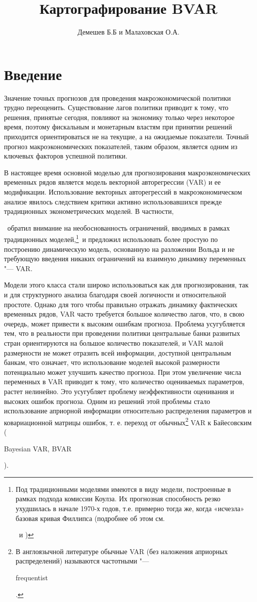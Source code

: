 \documentclass[11pt]{article} %
\title{Картографирование BVAR}
\author{Демешев Б.Б и Малаховская О.А.}
\newcommand{\eng}[1]{\begin{otherlanguage}{english}#1\end{otherlanguage}}
\begin{document}

\section{Введение}

Значение точных прогнозов для проведения макроэкономической политики трудно переоценить. Существование лагов политики приводит к тому, что решения, принятые сегодня, повлияют на экономику только через некоторое время, поэтому фискальным и монетарным властям при принятии решений приходится ориентироваться не на текущие, а на ожидаемые показатели. Точный прогноз макроэкономических показателей, таким образом, является одним из ключевых факторов успешной политики.

В настоящее время основной моделью для прогнозирования макроэкономических временных рядов является модель векторной  авторегрессии (VAR) и ее модификации. Использование векторных авторегрессий в макроэкономическом анализе явилось следствием критики активно использовавшихся прежде традиционных эконометрических моделей. В частности, \eng{\cite{sims_1980}}~обратил внимание на необоснованность ограничений, вводимых в рамках традиционных моделей,\footnote{Под традиционными моделями имеются в виду модели, построенные в рамках подхода комиссии Коулза. Их прогнозная способность резко ухудшилась в начале 1970-х годов, т.е. примерно тогда же, когда «исчезла» базовая кривая Филлипса (подробнее об этом см. \eng{\cite{favero_2001}}~и  \cite{malakhovskaya_pekarsky_rus_2012})}~и предложил использовать более простую по построению динамическую модель, основанную на разложении Вольда и не требующую введения никаких ограничений на взаимную динамику переменных "--- VAR.

 Модели этого класса стали широко использоваться как для прогнозирования, так и для структурного анализа благодаря своей логичности и относительной простоте.   Однако для того чтобы правильно отражать динамику фактических временных рядов, VAR часто требуется большое количество лагов, что, в свою очередь, может привести к высоким ошибкам прогноза. Проблема усугубляется тем, что в реальности при проведении политики центральные банки развитых стран ориентируются на большое количество показателей, и VAR малой размерности не может отразить всей информации, доступной центральным банкам, что  означает, что использование моделей высокой размерности потенциально может улучшить качество прогноза. При этом увеличение числа переменных в VAR приводит к тому, что количество оцениваемых параметров, растет нелинейно. Это усугубляет проблему неэффективности оценивания и высоких ошибок прогноза.
Одним из решений этой проблемы стало использование априорной информации относительно распределения параметров и ковариационной матрицы ошибок, т. е. переход от обычных\footnote{В англоязычной литературе обычные VAR (без наложения априорных распределений) называются частотными "--- \eng{frequentist}.} VAR к Байесовским (\eng{Bayesian VAR, BVAR}).
\end{document}
